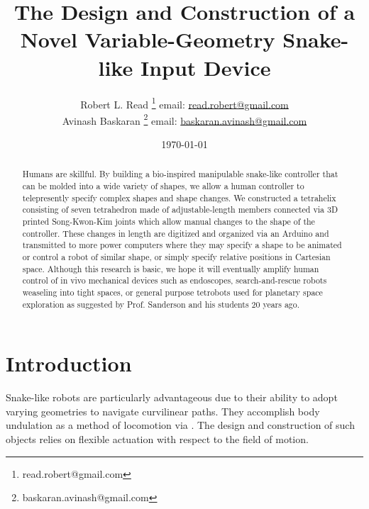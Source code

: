 \documentclass[11pt]{article}
\title{The Design and Construction of a Novel Variable-Geometry Snake-like Input Device}
\author{Robert L. Read
  \thanks{read.robert@gmail.com}
  email: \href{mailto:read.robert@gmail.com}{read.robert@gmail.com}\\
Avinash Baskaran
  \thanks{baskaran.avinash@gmail.com}
  email: \href{mailto:Baskaran.avinash@gmail.com}{baskaran.avinash@gmail.com}
  }
\affil{Public Invention, an educational non-profit.}
\date{\today}
\begin{document}
\maketitle



\nocite{read2018transforming,readtetrahelix}

\nocite{sanderson1996modular}

\nocite{lee1999dynamics}

\nocite{lee2002dynamic}

\nocite{NTRT}

\nocite{TetrobotBook}

\nocite{claypool2012readily}

\nocite{mirletz2014}

\nocite{paul2006}




\begin{abstract}

	Humans are skillful. By building a bio-inspired manipulable snake-like controller that can be molded into a wide variety of shapes, we allow a human controller to telepresently specify complex shapes and shape changes. We constructed a tetrahelix consisting of seven tetrahedron made of adjustable-length members connected via 3D printed Song-Kwon-Kim joints which allow manual changes to the shape of the controller. These changes in length are digitized and organized via an Arduino and transmitted to more power computers where they may specify a shape to be animated or control a robot of similar shape, or simply specify relative positions in Cartesian space. Although this research is basic, we hope it will eventually amplify human control of in vivo mechanical devices such as endoscopes, search-and-rescue robots weaseling into tight spaces, or general purpose tetrobots used for planetary space exploration as suggested by Prof. Sanderson and his students 20 years ago.

\end{abstract}


\section{Introduction}

Snake-like robots are particularly advantageous due to their ability to adopt varying geometries to navigate curvilinear paths.  They accomplish body undulation as a method of locomotion via . The design and construction of such objects relies on flexible actuation with respect to the field of motion.
\end{document}
